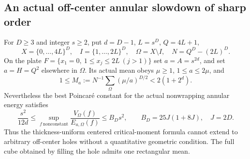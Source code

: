 \subsection{An actual off-center annular slowdown of sharp order}
\begin{theorem}\label{thm:offcenter221}
For $D\ge3$ and integer $s\ge2$, put $d=D-1$, $L=s^D$, $Q=4L+1$,
\[
 X=\{0,\ldots,4L\}^D,\quad I=\{1,\ldots,2L\}^D,
 \quad\Omega=X\setminus I,\quad N=Q^D-(2L)^D.
\]
On the plate $F=\{x_1=0,\ 1\le x_j\le2L\ (j>1)\}$ set
$a=A=s^{2d}$, and set $a=H=Q^2$ elsewhere in $\Omega$.
Its actual mean obeys $\mu\ge1$, $1\le a\le2\mu$, and
\[
 1\le M_a:=N^{-1}\sum_\Omega(\mu/a)^{D/2}
           <2(1+2^d).
\]
Nevertheless the best Poincar\'e constant for the actual nonwrapping
annular energy satisfies
\[
 \frac{s^2}{12d}\le
 \sup_{f\ \text{nonconstant}}\frac{V_\Omega(f)}{E_{a,\Omega}(f)}
 \le B_Ds^2,\qquad B_D=25J(1+8J),\quad J=2D.
\]
Thus the thickness-uniform centered critical-moment formula cannot extend
to arbitrary off-center holes without a quantitative geometric condition.
The full cube obtained by filling the hole admits one rectangular mean.
\end{theorem}
